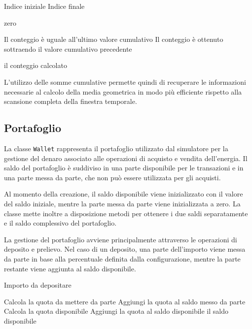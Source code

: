 \documentclass[a4paper,oneside,italian]{sapthesis}
\begin{document}
\begin{algorithm}[H]
\caption{Conteggio dei prezzi validi}
\label{alg:electricity-grid-valid-count}
\begin{algorithmic}[1]

\Require Indice iniziale
\Require Indice finale

    \State \Return zero
\EndIf

    \State Il conteggio è uguale all'ultimo valore cumulativo
\Else
    \State Il conteggio è ottenuto sottraendo il valore cumulativo precedente
\EndIf

\State \Return il conteggio calcolato

\end{algorithmic}
\end{algorithm}

L'utilizzo delle somme cumulative permette quindi di recuperare le
informazioni necessarie al calcolo della media geometrica in modo più
efficiente rispetto alla scansione completa della finestra temporale.

\subsection{Portafoglio}

La classe \texttt{Wallet} rappresenta il portafoglio utilizzato dal simulatore
per la gestione del denaro associato alle operazioni di acquisto e vendita
dell'energia. Il saldo del portafoglio è suddiviso in una parte disponibile
per le transazioni e in una parte messa da parte, che non può essere
utilizzata per gli acquisti.

Al momento della creazione, il saldo disponibile viene inizializzato con il
valore del saldo iniziale, mentre la parte messa da parte viene inizializzata
a zero. La classe mette inoltre a disposizione metodi per ottenere i due
saldi separatamente e il saldo complessivo del portafoglio.

La gestione del portafoglio avviene principalmente attraverso le operazioni
di deposito e prelievo. Nel caso di un deposito, una parte dell'importo viene
messa da parte in base alla percentuale definita dalla configurazione,
mentre la parte restante viene aggiunta al saldo disponibile.

\begin{algorithm}[H]
\caption{Deposito nel portafoglio}
\label{alg:wallet-deposit}
\begin{algorithmic}[1]

\Require Importo da depositare

\State Calcola la quota da mettere da parte
\State Aggiungi la quota al saldo messo da parte
\State Calcola la quota disponibile
\State Aggiungi la quota al saldo disponibile
\State \Return il saldo disponibile

\end{algorithmic}
\end{algorithm}
\end{document}
